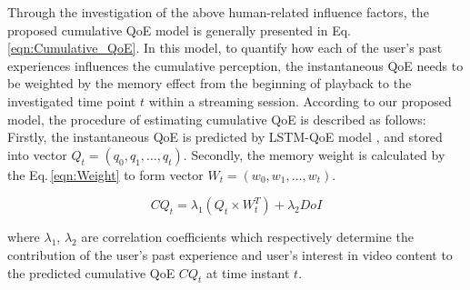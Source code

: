 Through the investigation of the above human-related influence factors, the proposed cumulative QoE model is generally presented in Eq.\,\ref{eqn:Cumulative_QoE}. In this model,
to quantify how each of the user's past experiences influences the cumulative perception,
the instantaneous QoE needs to be weighted by the memory effect from the beginning of playback to the investigated time point $t$ within a streaming session.
According to our proposed model, the procedure of estimating cumulative QoE is described as follows: Firstly, the instantaneous QoE is predicted by LSTM-QoE model \cite{QoEModel_LSTM}, and stored into vector ${Q}_{t} = (q_{0},  q_{1}, \dots, q_{t})$. Secondly, the memory weight is calculated by the Eq.\,\ref{eqn:Weight} to form vector ${W}_{t} = (w_{0},  w_{1}, \dots, w_{t})$.

\begin{equation} \label{eqn:Cumulative_QoE}
  CQ_{t} = \lambda_{1} \left ( {Q}_{t}\times{W}^{T}_{t} \right ) + \lambda_{2}DoI
\end{equation}

where $\lambda_{1}$, $\lambda_{2}$ are correlation coefficients which respectively determine the contribution of the user's past experience and user's interest in video content to the predicted cumulative QoE $CQ_{t}$ at time instant $t$.
